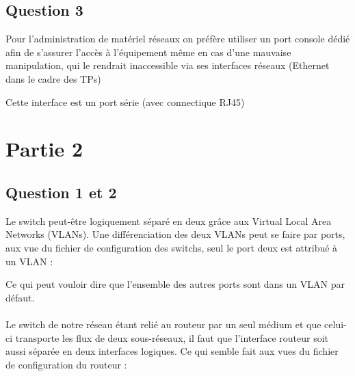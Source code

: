 \documentclass[12pt,a4paper,notitlepage]{article}
\begin{document}
\subsection{Question 3}

Pour l'administration de matériel réseaux on préfère utiliser un port console dédié afin de s'assurer l'accès à l'équipement même en cas d'une mauvaise manipulation, qui le rendrait inaccessible via ses interfaces réseaux (Ethernet dans le cadre des TPs)

Cette interface est un port série (avec connectique RJ45) 


\section{Partie 2}
\subsection{Question 1 et 2}

Le switch peut-être logiquement séparé en deux grâce aux Virtual Local Area Networks (VLANs). Une différenciation des deux VLANs peut se faire par ports, aux vue du fichier de configuration des switchs, seul le port deux est attribué à un VLAN :

\begin{center}
 \end{center}
 
Ce qui peut vouloir dire que l'ensemble des autres ports sont dans un VLAN par défaut.

\paragraph{}Le switch de notre réseau étant relié au routeur par un seul médium et que celui-ci transporte les flux de deux sous-réseaux, il faut que l'interface routeur soit aussi séparée en deux interfaces logiques. Ce qui semble fait aux vues du fichier de configuration du routeur :
\end{document}
